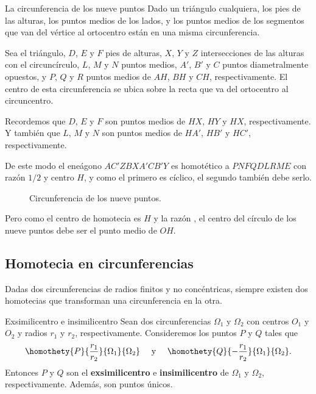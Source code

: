 \begin{section-example.tcb}{La circunferencia de los nueve puntos}{}
    Dado un triángulo cualquiera, los pies de las alturas, los puntos medios de los lados, y los puntos medios de los segmentos que van del vértice al ortocentro están en una misma circunferencia.
\end{section-example.tcb}
\begin{solution}
    \begin{multicols}{2}
        Sea  el triángulo, $D$, $E$ y $F$ pies de alturas, $X$, $Y$ y $Z$ intersecciones de las alturas con el circuncírculo, $L$, $M$ y $N$ puntos medios, $A'$, $B'$ y $C$ puntos diametralmente opuestos, y $P$, $Q$ y $R$ puntos medios de $AH$, $BH$ y $CH$, respectivamente.
        El centro de esta circunferencia se ubica sobre la recta que va del ortocentro al circuncentro.


        Recordemos que $D$, $E$ y $F$ son puntos medios de $HX$, $HY$ y $HX$, respectivamente.
        Y también que $L$, $M$ y $N$ son puntos medios de $HA'$, $HB'$ y $HC'$, respectivamente.


        De este modo el eneágono $AC' ZBXA' CB' Y$ es homotético a $PNFQDLRME$ con razón $1/2$ y centro $H$, y como el primero es cíclico, el segundo también debe serlo.
        \begin{figure}[H]
            \centering
            
            \caption{Circunferencia de los nueve puntos.}
        \end{figure}
    \end{multicols}
    Pero como el centro de homotecia es $H$ y la razón , el centro del círculo de los nueve puntos debe ser el punto medio de $OH$.
\end{solution}



\subsection{Homotecia en circunferencias}
Dadas dos circunferencias de radios finitos y no concéntricas, siempre existen dos homotecias que transforman una circunferencia en la otra.

\begin{section-definition.tcb}{Exsimilicentro e insimilicentro}{}
    Sean dos circunferencias $\Omega_1$ y $\Omega_2$ con centros $O_1$ y $O_2$ y radios $r_1$ y $r_2$, respectivamente.
    Consideremos los puntos $P$ y $Q$ tales que
    \[
        \homothety{P}{\dfrac{r_1}{r_2}}{\Omega_1}{\Omega_2} \quad \  \text{y}\  \quad \homothety{Q}{-\dfrac{r_1}{r_2}}{\Omega_1}{\Omega_2}.
    \]
    Entonces $P$ y $Q$ son el \textbf{exsimilicentro} e \textbf{insimilicentro} de $\Omega_1$ y $\Omega_2$, respectivamente.
    Además, son puntos únicos.
\end{section-definition.tcb}

